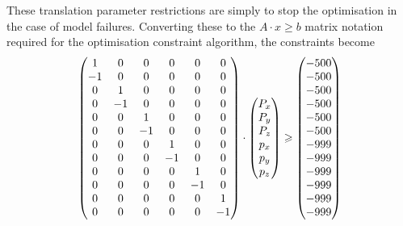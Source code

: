 These translation parameter restrictions are simply to stop the optimisation in the case of model failures.
Converting these to the $A \cdot x \geqslant b$ matrix notation required for the optimisation constraint algorithm, the constraints become
\begin{equation}
    \begin{pmatrix}
         1 & 0 & 0 & 0 & 0 & 0 \\
        -1 & 0 & 0 & 0 & 0 & 0 \\
         0 & 1 & 0 & 0 & 0 & 0 \\
         0 &-1 & 0 & 0 & 0 & 0 \\
         0 & 0 & 1 & 0 & 0 & 0 \\
         0 & 0 &-1 & 0 & 0 & 0 \\
         0 & 0 & 0 & 1 & 0 & 0 \\
         0 & 0 & 0 &-1 & 0 & 0 \\
         0 & 0 & 0 & 0 & 1 & 0 \\
         0 & 0 & 0 & 0 &-1 & 0 \\
         0 & 0 & 0 & 0 & 0 & 1 \\
         0 & 0 & 0 & 0 & 0 &-1 \\
    \end{pmatrix}
    \cdot
    \begin{pmatrix}
        P_x \\
        P_y \\
        P_z \\
        p_x \\
        p_y \\
        p_z \\
    \end{pmatrix}
    \geqslant
    \begin{pmatrix}
        -500 \\
        -500 \\
        -500 \\
        -500 \\
        -500 \\
        -500 \\
        -999 \\
        -999 \\
        -999 \\
        -999 \\
        -999 \\
        -999 \\
    \end{pmatrix}
\end{equation}

